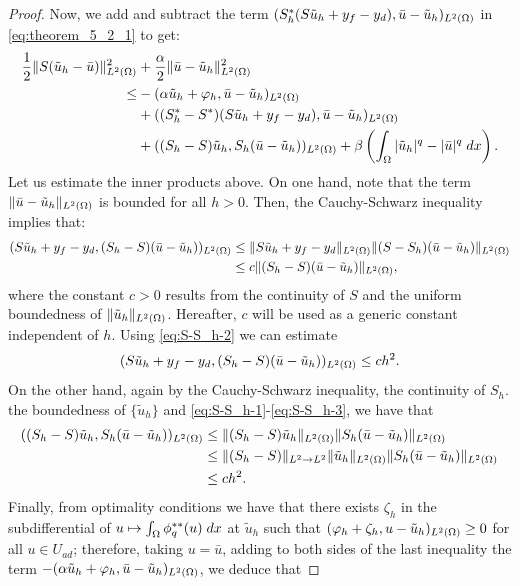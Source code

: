 {\begin{proof}
%     
Now, we add and subtract the term $(S^{*}_h(S\tilde u_h+y_f-y_d),\bar u-\tilde u_h)_{L^2(\Omega)}$ in \eqref{eq:theorem_5_2_1} to get: 
%
\begin{equation}
       \begin{aligned}
          \frac{1}{2}\lVert S(\tilde u_h-\bar u) \rVert_{L^2(\Omega)}^2&+ \frac{\alpha}{2}\lVert \bar u-\tilde u_h \rVert_{L^2(\Omega)}^2 \\
          \le& -(\alpha \tilde u_h+\varphi_h,\bar u-\tilde u_h)_{L^2(\Omega)}\\
          &+((S_h^*-S^*)(S\tilde u_h+y_f-y_d),\bar u-\tilde u_h)_{L^2(\Omega)}\\
          &+((S_h-S)\tilde u_h,S_h(\bar u-\tilde u_h))_{L^2(\Omega)}+\beta \left(\int_{\Omega}|\tilde u_h|^q-|\bar u|^q\; dx\right).  \label{eq:theorem_5_2}
    \end{aligned}   
\end{equation}
Let us estimate the inner products above. On one hand, note that the term $\lVert \bar u-\tilde u_h \rVert_{L^2(\Omega)}$ is bounded for all $h>0$.  Then,  the Cauchy-Schwarz inequality implies that:
\begin{align*}
    (S\tilde u_h+y_f-y_d,(S_h-S)(\bar u-\tilde u_h))_{L^2(\Omega)}&\le \lVert S\tilde u_h+y_f-y_d \rVert_{L^2(\Omega)}\lVert (S-S_h)(\bar u-\tilde u_h) \rVert_{L^2(\Omega)}\\
    &\le c\lVert (S_h-S)(\bar u-\tilde u_h) \rVert_{L^2(\Omega)},
\end{align*}
where  the constant $c>0$ results from the continuity of $S$ and the uniform boundedness of $\lVert \tilde u_h \rVert_{L^2(\Omega)}$. Hereafter, $c$ will be used as a generic constant independent of $h$.  Using \eqref{eq:S-S_h-2} we can estimate
\begin{equation}\label{eq:theorem_5_4}
     (S\tilde u_h+y_f-y_d,(S_h-S)(\bar u-\tilde u_h))_{L^2(\Omega)}\le {c}h^2.
\end{equation}
On the other hand, again by the Cauchy-Schwarz inequality, the continuity of $S_h$. the boundedness of $\{\tilde u_h\}$ and \eqref{eq:S-S_h-1}-\eqref{eq:S-S_h-3}, we have that 
\begin{align}
((S_h-S)\tilde u_h,S_h(\bar u-\tilde u_h))_{L^2(\Omega)}&\le \lVert (S_h-S)\tilde u_h \rVert_{L^2(\Omega)}\lVert S_h(\bar u-\tilde u_h) \rVert_{L^2(\Omega)}\nonumber\\
&\le\lVert (S_h-S) \rVert_{L^2\to L^2}\|\tilde u_h\| _{L^2(\Omega)}\lVert S_h(\bar u-\tilde u_h) \rVert_{L^2(\Omega)} \nonumber\\
&\le ch^2. \label{eq:theorem_5_5}
\end{align}
Finally, from optimality conditions we have that there exists $\zeta_h$ in the subdifferential of $u\mapsto \int_{\Omega}\phi_q^{**}(u)\; dx$ at $\tilde u_h$ such that $(\varphi_h+\zeta_h,u-\tilde u_h)_{L^2(\Omega)}\ge 0$ for all $u\in U_{ad}$; therefore, taking $u=\bar u$, adding to both sides of the last inequality the term $-(\alpha \tilde u_h+\varphi_h,\bar u-\tilde u_h)_{L^2(\Omega)}$, we deduce that

\end{proof}}
